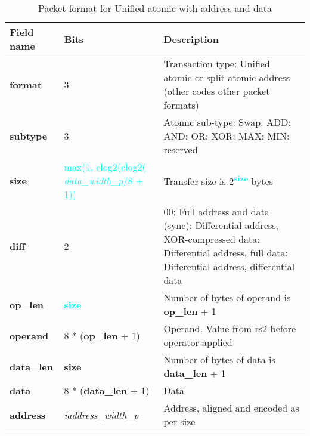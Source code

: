\begin{table}[htp]
  \centering
  \caption{Packet format for Unified atomic with address and data}
  \label{tab:te_datadx0y5}
  \begin{tabulary}{\textwidth}{|l|p{38mm}|p{92mm}|}
    \hline
    {\bf Field name} & {\bf Bits} & {\bf Description} \\
    \hline
    \textbf{format} & 	3	& Transaction type: Unified atomic or split atomic address\newline	
		(other codes other packet formats)\\
    \hline
    \textbf{subtype} & 	3	& Atomic sub-type: Swap: ADD: AND: OR: XOR: MAX: MIN: reserved\\	

    \hline
    \textbf{size} & \textcolor{cyan}{max(1, clog2(clog2( \textit{data\_width\_p}/8 + 1))} & Transfer size is 2\textsuperscript{\textcolor{cyan}{\textbf{size}}} bytes\\
    \hline
    \textbf{diff} & 2 & 00: Full address and data (sync): Differential address, XOR-compressed data: Differential address, full data: Differential address, differential data\\
    \hline
    \textbf{op\_len} & \textcolor{cyan}{\textbf{size}} & Number of bytes of operand is \textbf{op\_len} + 1\\
    \hline
    \textbf{operand}	& 8 * (\textbf{op\_len} + 1) & Operand.  Value from rs2 before operator applied\\
    \hline
    \textbf{data\_len}	& \textbf{size} & Number of bytes of data is \textbf{data\_len} + 1\\
    \hline
    \textbf{data} & 8 * (\textbf{data\_len} + 1) & 
                Data\\
    \hline
    \textbf{address} &  \textit{iaddress\_width\_p} & Address, aligned and encoded as per size \\
    \hline
  \end{tabulary}
\end{table}

